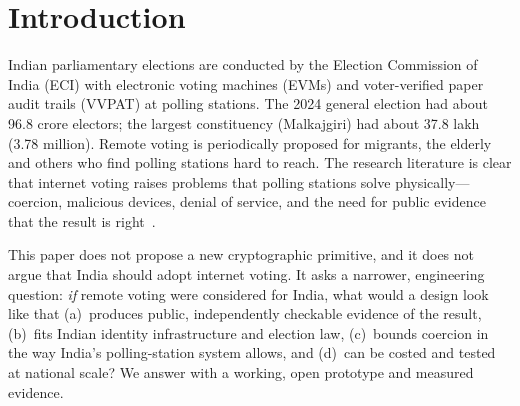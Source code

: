 \documentclass[runningheads]{llncs}
\begin{document}
\section{Introduction}

Indian parliamentary elections are conducted by the Election Commission of India (ECI) with electronic voting machines (EVMs) and voter-verified paper audit trails (VVPAT) at polling stations. The 2024 general election had about 96.8 crore electors; the largest constituency (Malkajgiri) had about 37.8 lakh (3.78 million). Remote voting is periodically proposed for migrants, the elderly and others who find polling stations hard to reach. The research literature is clear that internet voting raises problems that polling stations solve physically---coercion, malicious devices, denial of service, and the need for public evidence that the result is right~\cite{park2021,bernhard2017,springall2014,haines2020}.

This paper does not propose a new cryptographic primitive, and it does not argue that India should adopt internet voting. It asks a narrower, engineering question: \emph{if} remote voting were considered for India, what would a design look like that (a)~produces public, independently checkable evidence of the result, (b)~fits Indian identity infrastructure and election law, (c)~bounds coercion in the way India's polling-station system allows, and (d)~can be costed and tested at national scale? We answer with a working, open prototype and measured evidence.
\end{document}
